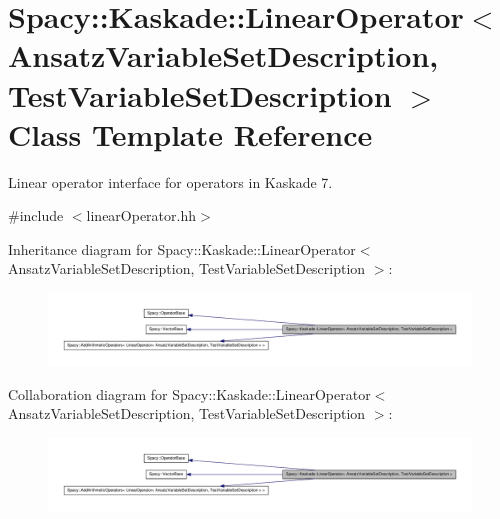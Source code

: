 \hypertarget{classSpacy_1_1Kaskade_1_1LinearOperator}{\section{\-Spacy\-:\-:\-Kaskade\-:\-:\-Linear\-Operator$<$ \-Ansatz\-Variable\-Set\-Description, \-Test\-Variable\-Set\-Description $>$ \-Class \-Template \-Reference}
\label{classSpacy_1_1Kaskade_1_1LinearOperator}
}


\-Linear operator interface for operators in \-Kaskade 7.  




{\ttfamily \#include $<$linear\-Operator.\-hh$>$}



\-Inheritance diagram for \-Spacy\-:\-:\-Kaskade\-:\-:\-Linear\-Operator$<$ \-Ansatz\-Variable\-Set\-Description, \-Test\-Variable\-Set\-Description $>$\-:
\nopagebreak
\begin{figure}[H]
\begin{center}
\leavevmode
\includegraphics[width=350pt]{classSpacy_1_1Kaskade_1_1LinearOperator__inherit__graph}
\end{center}
\end{figure}


\-Collaboration diagram for \-Spacy\-:\-:\-Kaskade\-:\-:\-Linear\-Operator$<$ \-Ansatz\-Variable\-Set\-Description, \-Test\-Variable\-Set\-Description $>$\-:
\nopagebreak
\begin{figure}[H]
\begin{center}
\leavevmode
\includegraphics[width=350pt]{classSpacy_1_1Kaskade_1_1LinearOperator__coll__graph}
\end{center}
\end{figure}
